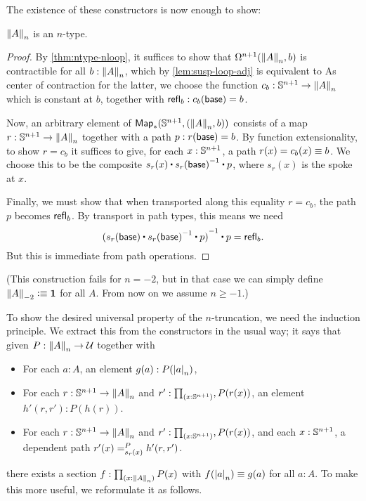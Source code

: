 \noindent
The existence of these constructors is now enough to show:

\begin{lem}
  $\trunc n A$ is an $n$-type.
\end{lem}
\begin{proof}
  By \autoref{thm:ntype-nloop}, it suffices to show that $\Omega ^{n+1}(\trunc nA,b)$ is contractible for all $b:\trunc nA$, which by
\autoref{lem:susp-loop-adj} is equivalent to 
  As center of contraction for the latter, we choose the function $c_b:\Sn^{n+1} \to \trunc nA$ which is constant at $b$, together with
$\refl b : c_b(\base) = b$.

  Now, an arbitrary element of $\Map_*(\Sn^{n+1},(\trunc nA,b))$ consists of a map $r:\Sn^{n+1} \to \trunc n A$ together with a path
$p:r(\base)=b$.
  By function extensionality, to show $r = c_b$ it suffices to give, for each $x:\Sn^{n+1}$, a path $r(x)=c_b(x) \jdeq b$.
  We choose this to be the composite $s_r(x) \ct \opp{s_r(\base)} \ct p$, where $s_r(x)$ is the spoke at $x$.


  Finally, we must show that when transported along this equality $r=c_b$, the path $p$ becomes $\refl b$.
  By transport in path types, this means we need
  \[\opp{(s_r(\base) \ct \opp{s_r(\base)} \ct p)} \ct p = \refl b.\]
  But this is immediate from path operations.
\end{proof}

(This construction fails for $n=-2$, but in that case we can simply define $\trunc{-2}{A}\defeq \unit$ for all $A$.
From now on we assume $n\ge -1$.)

%
To show the desired universal property of the $n$-truncation, we need the induction principle.
We extract this from the constructors in the usual way; it says that given $P:\trunc nA\to\type$ together with
\begin{itemize}
\item For each $a:A$, an element $g(a) : P(\tproj na)$,
\item For each $r:\Sn^{n+1} \to \trunc n A$ and $r':\prd{x:\Sn^{n+1}}, P(r(x))$, an element $h'(r,r'):P(h(r))$.
\item For each $r:\Sn^{n+1} \to \trunc n A$ and $r':\prd{x:\Sn^{n+1}}, P(r(x))$, and each $x:\Sn^{n+1}$, a dependent path
$\dpath{P}{s_r(x)}{r'(x)}{h'(r,r')}$.
\end{itemize}
there exists a section $f:\prd{x:\trunc n A} P(x)$ with $f(\tproj n a) \jdeq g(a)$ for all $a:A$.
To make this more useful, we reformulate it as follows.

